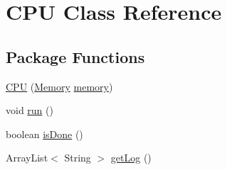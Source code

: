 \hypertarget{class_c_p_u}{}\section{C\+PU Class Reference}
\label{class_c_p_u}
\subsection*{Package Functions}
\begin{DoxyCompactItemize}
\item 
\mbox{\hyperlink{class_c_p_u_a87583bf8515df1ec28ee821d277b4da3}{C\+PU}} (\mbox{\hyperlink{class_memory}{Memory}} \mbox{\hyperlink{class_c_p_u_ab4c72eef96047317697752abe6b63d43}{memory}})
\item 
void \mbox{\hyperlink{class_c_p_u_ad9caa09946940961ed789371a41ad683}{run}} ()
\item 
boolean \mbox{\hyperlink{class_c_p_u_aef889eba6973e62664310a5ef8f9654d}{is\+Done}} ()
\item 
Array\+List$<$ String $>$ \mbox{\hyperlink{class_c_p_u_a594b92f9f813ab337f27eff0ec9bd0c5}{get\+Log}} ()
\end{DoxyCompactItemize}
